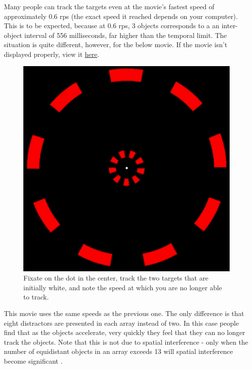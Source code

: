 \documentclass[
]{book}
\begin{document}
Many people can track the targets even at the movie's fastest speed of approximately 0.6 rps (the exact speed it reached depends on your computer). This is to be expected, because at 0.6 rps, 3 objects corresponds to a an inter-object interval of 556 milliseconds, far higher than the temporal limit. The situation is quite different, however, for the below movie. If the movie isn't displayed properly, view it \href{movies/MOTmovies/temporalLimits/2targets9objectsPerArray.gif}{here}.

\begin{figure}
\includegraphics[width=1\linewidth]{movies/MOTmovies/temporalLimits/static_2targets9objectsPerArray} \caption{Fixate on the dot in the center, track the two targets that are initially white, and note the speed at which you are no longer able to track.}\label{fig:twoTargetsTemporalLimit}
\end{figure}

This movie uses the same speeds as the previous one. The only difference is that eight distractors are presented in each array instead of two. In this case people find that as the objects accelerate, very quickly they feel that they can no longer track the objects. Note that this is not due to spatial interference - only when the number of equidistant objects in an array exceeds 13 will spatial interference become significant \citetext{\citealp[p.11]{holcombeSplittingAttentionReduces2013}; \citealp{toetTwodimensionalShapeSpatial1992}; \citealp{pelliUncrowdedWindowObject2008}}.
\end{document}
